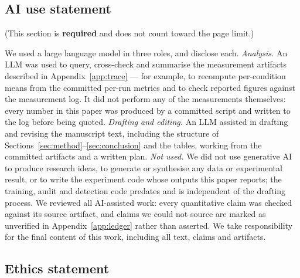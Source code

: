 \documentclass{article}
\begin{document}
\subsection*{AI use statement}

(This section is \textbf{required} and does not count toward the page limit.)

We used a large language model in three roles, and disclose each.
\emph{Analysis.} An LLM was used to query, cross-check and summarise the
measurement artifacts described in Appendix~\ref{app:trace} --- for example, to
recompute per-condition means from the committed per-run metrics and to check
reported figures against the measurement log. It did not perform any of the
measurements themselves: every number in this paper was produced by a committed
script and written to the log before being quoted.
\emph{Drafting and editing.} An LLM assisted in drafting and revising the
manuscript text, including the structure of Sections~\ref{sec:method}--\ref{sec:conclusion}
and the tables, working from the committed artifacts and a written plan.
\emph{Not used.} We did not use generative AI to produce research ideas, to
generate or synthesise any data or experimental result, or to write the
experiment code whose outputs this paper reports; the training, audit and
detection code predates and is independent of the drafting process.
We reviewed all AI-assisted work: every quantitative claim was checked against
its source artifact, and claims we could not source are marked as unverified in
Appendix~\ref{app:ledger} rather than asserted. We take responsibility for the
final content of this work, including all text, claims and artifacts.

\subsection*{Ethics statement}
\end{document}
